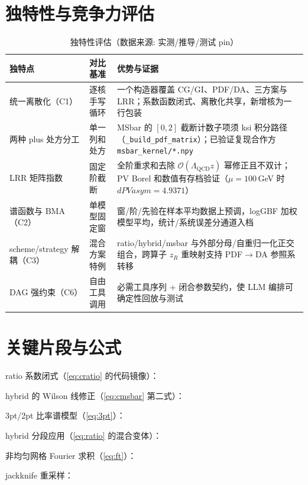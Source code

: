 \documentclass[UTF8]{ctexart}
\begin{document}
\section{独特性与竞争力评估}
\begin{table}[htbp]\centering
\begin{tabularx}{\textwidth}{lXX}
\toprule
\textcolor{algo}{独特点} & 对比基准 & 优势与证据 \\
\midrule
统一离散化（C1） & 逐核手写循环 & 一个构造器覆盖 CG/GI、PDF/DA、三方案与 LRR；系数函数闭式、离散化共享，新增核为一行包装 \\
两种 plus 处方分工 & 单一列和处方 & MSbar 的 $[0,2]$ 截断计数子项须 ksi 积分路径（\texttt{\_build\_pdf\_matrix}）；已验证复现合作方 \texttt{msbar\_kernel/*.npy} \\
LRR 矩阵指数 & 固定阶截断 & 全阶重求和去除 $\mathcal O(\Lambda_{\mathrm{QCD}}z)$ 幂修正且不双计；PV Borel 和数值有存档验证（$\mu=100$\,GeV 时 $dPVasym=4.9371$） \\
谱函数与 BMA（C2） & 单模型固定窗 & 窗/阶/先验在样本平均数据上预调，logGBF 加权模型平均，统计/系统误差分通道入档 \\
scheme/strategy 解耦（C3） & 混合方案特例 & ratio/hybrid/msbar 与外部分母/自重归一化正交组合，跨算子 $z_R$ 重映射支持 PDF$\to$DA 参照系转移 \\
DAG 强约束（C6） & 自由工具调用 & 必需工具序列 + 闭合参数契约，使 LLM 编排可确定性回放与测试 \\
\bottomrule
\end{tabularx}
\caption{独特性评估（数据来源: 实测/推导/测试 pin）}
\end{table}

\section{关键片段与公式}
ratio 系数闭式（\eqref{eq:cratio} 的代码镜像）：

hybrid 的 Wilson 线修正（\eqref{eq:cmsbar} 第二式）：

3pt/2pt 比率谱模型（\eqref{eq:3pt}）：

hybrid 分段应用（\eqref{eq:ratio} 的混合变体）：

非均匀网格 Fourier 求积（\eqref{eq:ft}）：

jackknife 重采样：

\end{document}
